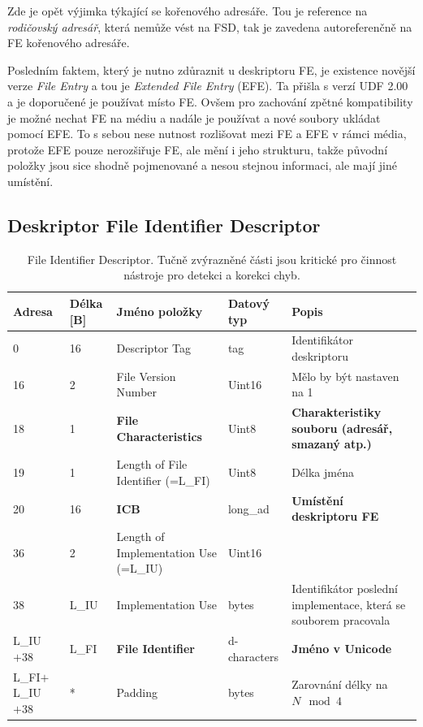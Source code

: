 Zde je opět výjimka týkající se kořenového adresáře. Tou je reference na \textit{rodičovský adresář}, která nemůže vést na FSD, tak je zavedena autoreferenčně na FE kořenového adresáře.

Posledním faktem, který je nutno zdůraznit u deskriptoru FE, je existence novější verze \textit{File Entry} a tou je \textit{Extended File Entry} (EFE). Ta přišla s verzí UDF 2.00 a je doporučené je používat místo FE. Ovšem pro zachování zpětné kompatibility je možné nechat FE na médiu a nadále je používat a nové soubory ukládat pomocí EFE. To s sebou nese nutnost rozlišovat mezi FE a EFE v rámci média, protože EFE pouze nerozšiřuje FE, ale mění i jeho strukturu, takže původní položky jsou sice shodně pojmenované a nesou stejnou informaci, ale mají jiné umístění. 

\subsection{Deskriptor File Identifier Descriptor}
\label{subsec:fid}
\begin{table}[t]
    \centering
    \begin{tabular}{ | l | l | p{3.2cm} | p{1.8cm} | p{4.4cm} | }
        \hline
        Adresa  & Délka [B]   & Jméno položky & Datový typ    & Popis \\ \hline\hline
        0   &16               & Descriptor Tag                    & tag           & Identifikátor deskriptoru \\ \hline
        16  &2                & File Version Number               & Uint16        & Mělo by být nastaven na 1 \\ \hline
        18  &1                & \textbf{File Characteristics}     & Uint8         & \textbf{Charakteristiky souboru (adresář, smazaný atp.)} \\ \hline
        19  &1                & Length of File Identifier (=L\_FI)& Uint8         & Délka jména \\ \hline
        20  &16               & \textbf{ICB}                      & long\_ad      & \textbf{Umístění deskriptoru FE} \\ \hline
        36  &2                & Length of Implementation Use (=L\_IU)& Uint16     &  \\ \hline
        38  &L\_IU            & Implementation Use                & bytes         & Identifikátor poslední implementace, která se souborem pracovala \\ \hline
        L\_IU$+38$&L\_FI      & \textbf{File Identifier}          & d-characters  & \textbf{Jméno v Unicode} \\ \hline
        L\_FI$+$L\_IU$+38$&*  & Padding                           & bytes         & Zarovnání délky na $N \mod 4$ \\ \hline
    \end{tabular}
    \caption{File Identifier Descriptor. Tučně zvýrazněné části jsou kritické pro činnost nástroje pro detekci a korekci chyb.\label{tab:fid}}
\end{table}
